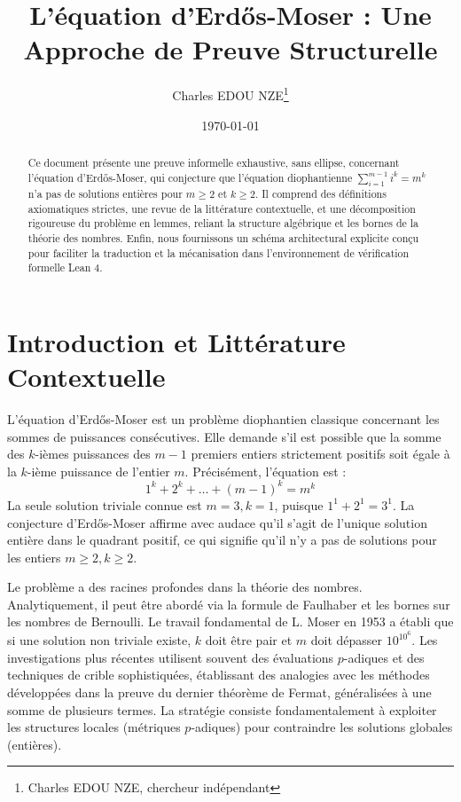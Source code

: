 \documentclass[11pt,a4paper]{article}
\title{L'équation d'Erd\H{o}s-Moser : Une Approche de Preuve Structurelle}
\author{Charles EDOU NZE\thanks{Charles EDOU NZE, chercheur indépendant}}
\date{\today}
\begin{document}
\maketitle

\begin{abstract}
Ce document présente une preuve informelle exhaustive, sans ellipse, concernant l'équation d'Erd\H{o}s-Moser, qui conjecture que l'équation diophantienne $\sum_{i=1}^{m-1} i^k = m^k$ n'a pas de solutions entières pour $m \ge 2$ et $k \ge 2$. Il comprend des définitions axiomatiques strictes, une revue de la littérature contextuelle, et une décomposition rigoureuse du problème en lemmes, reliant la structure algébrique et les bornes de la théorie des nombres. Enfin, nous fournissons un schéma architectural explicite conçu pour faciliter la traduction et la mécanisation dans l'environnement de vérification formelle Lean 4.
\end{abstract}

\tableofcontents

\newpage

\section{Introduction et Littérature Contextuelle}
L'équation d'Erd\H{o}s-Moser est un problème diophantien classique concernant les sommes de puissances consécutives. Elle demande s'il est possible que la somme des $k$-ièmes puissances des $m-1$ premiers entiers strictement positifs soit égale à la $k$-ième puissance de l'entier $m$. Précisément, l'équation est :
\begin{equation}
1^k + 2^k + \dots + (m-1)^k = m^k
\end{equation}
La seule solution triviale connue est $m=3, k=1$, puisque $1^1 + 2^1 = 3^1$. La conjecture d'Erd\H{o}s-Moser affirme avec audace qu'il s'agit de l'unique solution entière dans le quadrant positif, ce qui signifie qu'il n'y a pas de solutions pour les entiers $m \ge 2, k \ge 2$.

Le problème a des racines profondes dans la théorie des nombres. Analytiquement, il peut être abordé via la formule de Faulhaber et les bornes sur les nombres de Bernoulli. Le travail fondamental de L. Moser en 1953 a établi que si une solution non triviale existe, $k$ doit être pair et $m$ doit dépasser $10^{10^6}$. Les investigations plus récentes utilisent souvent des évaluations $p$-adiques et des techniques de crible sophistiquées, établissant des analogies avec les méthodes développées dans la preuve du dernier théorème de Fermat, généralisées à une somme de plusieurs termes. La stratégie consiste fondamentalement à exploiter les structures locales (métriques $p$-adiques) pour contraindre les solutions globales (entières).
\end{document}
